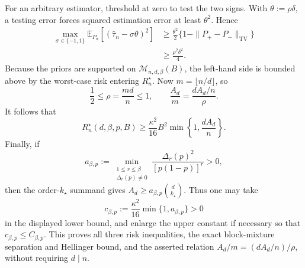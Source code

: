 For an arbitrary estimator, threshold at zero to test the two signs. With \(\theta:=\rho\delta\), a testing error forces squared estimation error at least \(\theta^2\). Hence
\[
\begin{aligned}
\max_{\sigma\in\{-1,1\}}
\mathbb E_{P_\sigma}[(\widehat\tau_n-\sigma\theta)^2]
&\ge\frac{\theta^2}{2}\{1-\|P_+-P_-\|_{\mathrm{TV}}\}\\
&\ge\frac{\rho^2\delta^2}{4}.
\end{aligned}
\]
Because the priors are supported on \(\mathcal M_{n,d,\beta}(B)\), the left-hand side is bounded above by the worst-case risk entering \(R_n^\star\). Now \(m=\lfloor n/d\rfloor\), so
\[
\frac12\le\rho=\frac{md}{n}\le1,
\qquad
\frac{A_d}{m}=\frac{dA_d/n}{\rho}.
\]
It follows that
\[
R_n^\star(d,\beta,p,B)
\ge\frac{\kappa^2}{16}B^2\min\!\left\{1,\frac{dA_d}{n}\right\}.
\]
Finally, if
\[
a_{\beta,p}:=\min_{\substack{1\le r\le\beta\\\Delta_r(p)\ne0}}
\frac{\Delta_r(p)^2}{[p(1-p)]^r}>0,
\]
then the order-\(k_\star\) summand gives \(A_d\ge a_{\beta,p}\binom d{k_\star}\). Thus one may take
\[
c_{\beta,p}:=\frac{\kappa^2}{16}\min\{1,a_{\beta,p}\}>0
\]
in the displayed lower bound, and enlarge the upper constant if necessary so that \(c_{\beta,p}\le C_{\beta,p}\). This proves all three risk inequalities, the exact block-mixture separation and Hellinger bound, and the asserted relation \(A_d/m=(dA_d/n)/\rho\), without requiring \(d\mid n\).